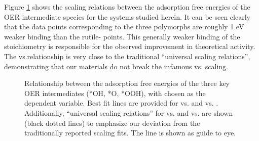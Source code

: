 %
Figure \ref{fig:scaling_relations} shows the scaling relations between the adsorption free energies of the OER intermediate species for the \IrOx systems studied herein.
%
It can be seen clearly that the data points corresponding to the three  polymorphs are roughly 1 eV weaker binding than the rutile- points.
%
This generally weaker binding of the  stoichiometry is responsible for the observed improvement in theoretical activity.
%
The \DGOOH vs.\DGOH relationship is very close to the traditional ``universal scaling relations'', demonstrating that our materials do not break the infamous \DGOOH vs. \DGOH scaling.


\begin{figure}[!htb]
\centering
{}
\caption{\label{fig:scaling_relations}
Relationship between the adsorption free energies of the three key OER intermediates (*OH, *O, *OOH), with \DGOH chosen as the dependent variable.
Best fit lines are provided for \DGOOH vs. \DGOH and \DGO vs. \DGOH.
%
Additionally, ``universal scaling relations'' for \DGOOH vs. \DGOH and \DGO vs. \DGOH are shown (black dotted lines) to emphasize our deviation from the traditionally reported scaling fits.
The \DGOH line is  shown as guide to eye.
}
\end{figure}

